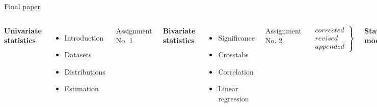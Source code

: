 \documentclass[t]{beamer}
\begin{document}
	\begin{frame}[t]{Final paper}
	
	\begin{columns}[T]
	\textbf{Univariate\\statistics}
	
	\vspace{.55em}
	\begin{itemize}
		\item Introduction
		\item Datasets
		\item Distributions
		\item Estimation
	\end{itemize}
	Assignment No. 1
	
	\textbf{Bivariate\\statistics}
	
	\begin{itemize}
		\item Significance
		\item Crosstabs
		\item Correlation
		\item Linear regression
	\end{itemize}
	Assignment No. 2
	
	$$
	\left.
    \begin{array}{rrr}
        corrected \\
        revised\\
        appended
    \end{array}
	\right \} 
	$$

	\textbf{Statistical\\modelling}
	

\end{columns}
\end{frame}
\end{document}
